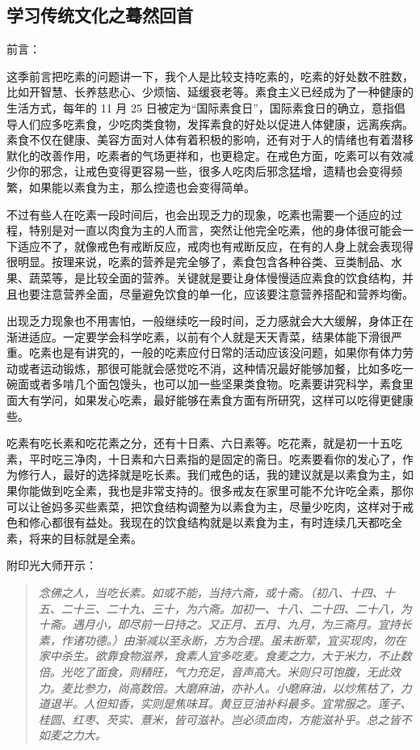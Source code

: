 \subsection{学习传统文化之蓦然回首}

前言：

这季前言把吃素的问题讲一下，我个人是比较支持吃素的，吃素的好处数不胜数，比如开智慧、长养慈悲心、少烦恼、延缓衰老等。素食主义已经成为了一种健康的生活方式，每年的 11 月 25 日被定为“国际素食日”，国际素食日的确立，意指倡导人们应多吃素食，少吃肉类食物，发挥素食的好处以促进人体健康，远离疾病。素食不仅在健康、美容方面对人体有着积极的影响，还有对于人的情绪也有着潜移默化的改善作用，吃素者的气场更祥和，也更稳定。在戒色方面，吃素可以有效减少你的邪念，让戒色变得更容易一些，很多人吃肉后邪念猛增，遗精也会变得频繁，如果能以素食为主，那么控遗也会变得简单。

不过有些人在吃素一段时间后，也会出现乏力的现象，吃素也需要一个适应的过程，特别是对一直以肉食为主的人而言，突然让他完全吃素，他的身体很可能会一下适应不了，就像戒色有戒断反应，戒肉也有戒断反应，在有的人身上就会表现得很明显。按理来说，吃素的营养是完全够了，素食包含各种谷类、豆类制品、水果、蔬菜等，是比较全面的营养。关键就是要让身体慢慢适应素食的饮食结构，并且也要注意营养全面，尽量避免饮食的单一化，应该要注意营养搭配和营养均衡。

出现乏力现象也不用害怕，一般继续吃一段时间，乏力感就会大大缓解，身体正在渐进适应。一定要学会科学吃素，以前有个人就是天天青菜，结果体能下滑很严重。吃素也是有讲究的，一般的吃素应付日常的活动应该没问题，如果你有体力劳动或者运动锻炼，那很可能就会感觉吃不消，这种情况最好能够加餐，比如多吃一碗面或者多啃几个面包馒头，也可以加一些坚果类食物。吃素要讲究科学，素食里面大有学问，如果发心吃素，最好能够在素食方面有所研究，这样可以吃得更健康些。

吃素有吃长素和吃花素之分，还有十日素、六日素等。吃花素，就是初一十五吃素，平时吃三净肉，十日素和六日素指的是固定的斋日。吃素要看你的发心了，作为修行人，最好的选择就是吃长素。我们戒色的话，我的建议就是以素食为主，如果你能做到吃全素，我也是非常支持的。很多戒友在家里可能不允许吃全素，那你可以让爸妈多买些素菜，把饮食结构调整为以素食为主，尽量少吃肉，这样对于戒色和修心都很有益处。我现在的饮食结构就是以素食为主，有时连续几天都吃全素，将来的目标就是全素。

附印光大师开示：

\begin{quote}\it
    念佛之人，当吃长素。如或不能，当持六斋，或十斋。（初八、十四、十五、二十三、二十九、三十，为六斋。加初一、十八、二十四、二十八，为十斋。遇月小，即尽前一日持之。又正月、五月、九月，为三斋月。宜持长素，作诸功德。）由渐减以至永断，方为合理。虽未断荤，宜买现肉，勿在家中杀生。欲靠食物滋养，食素人宜多吃麦。食麦之力，大于米力，不止数倍。光吃了面食，则精旺，气力充足，音声高大。米则只可饱腹，无此效力。麦比参力，尚高数倍。大磨麻油，亦补人。小磨麻油，以炒焦枯了，力道退半。人但知香，实则是焦味耳。黄豆豆油补料最多。宜常服之。莲子、桂圆、红枣、芡实、薏米，皆可滋补。岂必须血肉，方能滋补乎。总之皆不如麦之力大。
\end{quote}

